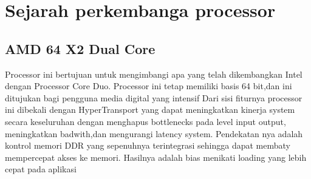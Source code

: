 \section{Sejarah perkembanga processor}
	\subsection{AMD 64 X2 Dual Core}
	Processor ini bertujuan untuk mengimbangi apa yang telah dikembangkan Intel dengan Processor Core Duo. Processor ini tetap memiliki basis 64 bit,dan ini ditujukan bagi pengguna media digital yang intensif
	Dari sisi fiturnya processor ini dibekali dengan HyperTransport yang dapat meningkatkan kinerja system secara keseluruhan dengan menghapus bottlenecks pada level input output, meningkatkan badwith,dan mengurangi latency system. Pendekatan nya adalah kontrol memori DDR yang sepenuhnya terintegrasi sehingga dapat membaty mempercepat akses ke memori. Hasilnya adalah bias menikati loading yang lebih cepat pada aplikasi

		
